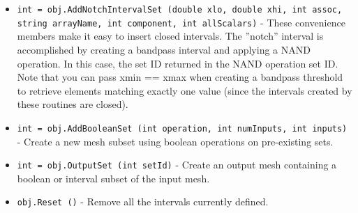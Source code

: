 \begin{itemize}
\item  \verb|int = obj.AddNotchIntervalSet (double xlo, double xhi, int assoc, string arrayName, int component, int allScalars)| -  These convenience members make it easy to insert closed intervals.
 The ''notch'' interval is accomplished by creating a bandpass interval and applying a NAND operation.
 In this case, the set ID returned in the NAND operation set ID.
 Note that you can pass xmin == xmax when creating a bandpass threshold to retrieve elements matching exactly
 one value (since the intervals created by these routines are closed).

\item  \verb|int = obj.AddBooleanSet (int operation, int numInputs, int inputs)| -  Create a new mesh subset using boolean operations on pre-existing sets.

\item  \verb|int = obj.OutputSet (int setId)| -  Create an output mesh containing a boolean or interval subset of the input mesh.

\item  \verb|obj.Reset ()| -  Remove all the intervals currently defined.

\end{itemize}
